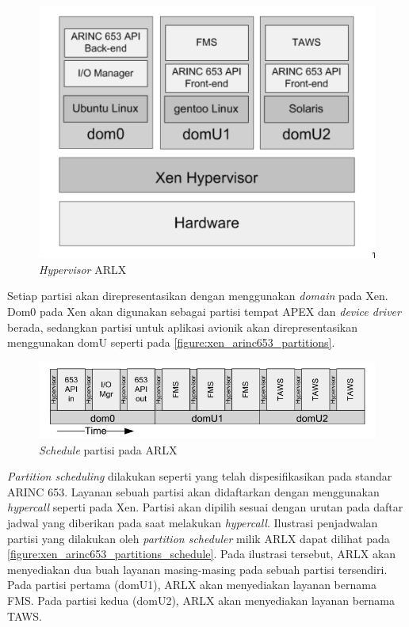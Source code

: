 \begin{figure}[!ht]
    \centering
    \includegraphics[scale=0.6]{resources/xen-arinc653-partitions.png}
    \vspace{10pt}
    \caption{\textit{Hypervisor} ARLX \citep{VanderLeest2010}}
    \label{figure:xen_arinc653_partitions}
\end{figure}

Setiap partisi akan direpresentasikan dengan menggunakan \textit{domain} pada Xen.  Dom0 pada
Xen akan digunakan sebagai partisi tempat APEX dan \textit{device driver} berada, sedangkan
partisi untuk aplikasi avionik akan direpresentasikan menggunakan domU seperti pada
\autoref{figure:xen_arinc653_partitions}.

\begin{figure}[!ht]
    \includegraphics[scale=0.6]{resources/xen-arinc653-partition-schedule.png}
    \vspace{15pt}
    \caption{\textit{Schedule} partisi pada ARLX \citep{VanderLeest2010}}
    \label{figure:xen_arinc653_partitions_schedule}
\end{figure}

\textit{Partition scheduling} dilakukan seperti yang telah dispesifikasikan pada standar ARINC
653. Layanan sebuah partisi akan didaftarkan dengan menggunakan \textit{hypercall} seperti pada
Xen. Partisi akan dipilih sesuai dengan urutan pada daftar jadwal yang diberikan pada saat
melakukan \textit{hypercall}.  Ilustrasi penjadwalan partisi yang dilakukan oleh
\textit{partition scheduler} milik ARLX dapat dilihat pada
\autoref{figure:xen_arinc653_partitions_schedule}. Pada ilustrasi tersebut, ARLX akan
menyediakan dua buah layanan masing-masing pada sebuah partisi tersendiri. Pada partisi pertama
(domU1), ARLX akan menyediakan layanan bernama FMS. Pada partisi kedua (domU2), ARLX akan
menyediakan layanan bernama TAWS.

